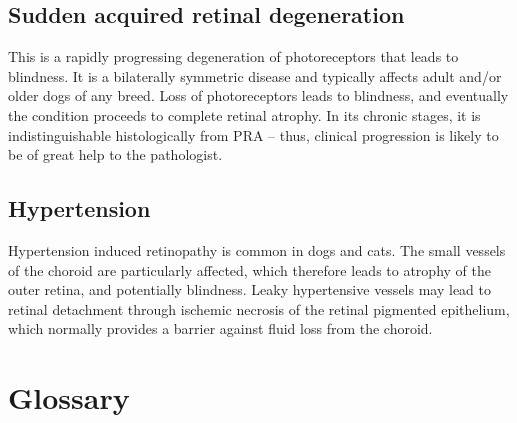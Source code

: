 \documentclass[openany]{book}
\begin{document}
\section{Sudden acquired retinal
degeneration}\label{sudden-acquired-retinal-degeneration}

This is a rapidly progressing degeneration of photoreceptors that leads
to blindness. It is a bilaterally symmetric disease and typically
affects adult and/or older dogs of any breed. Loss of photoreceptors
leads to blindness, and eventually the condition proceeds to complete
retinal atrophy. In its chronic stages, it is indistinguishable
histologically from PRA -- thus, clinical progression is likely to be of
great help to the pathologist.

\section{Hypertension}\label{hypertension}

Hypertension induced retinopathy is common in dogs and cats. The small
vessels of the choroid are particularly affected, which therefore leads
to atrophy of the outer retina, and potentially blindness. Leaky
hypertensive vessels may lead to retinal detachment through ischemic
necrosis of the retinal pigmented epithelium, which normally provides a
barrier against fluid loss from the choroid.

\hypertarget{glossary}{\chapter{Glossary}\label{glossary}}
\end{document}
